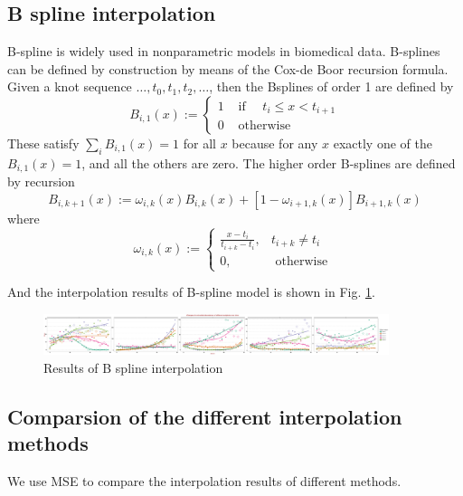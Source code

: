 \documentclass{article}
\begin{document}
\subsection{B spline interpolation}

B-spline is widely used in nonparametric models in biomedical data. B-splines can be defined by construction by means of the Cox-de Boor recursion formula. Given a knot sequence $\ldots, t_{0}, t_{1}, t_{2}, \ldots$, then the Bsplines of order 1 are defined by
\begin{equation}
    B_{i, 1}(x):= \begin{cases}1 & \text { if } \quad t_{i} \leq x<t_{i+1} \\ 0 & \text { otherwise }\end{cases}
    \end{equation}
These satisfy $\sum_{i} B_{i, 1}(x)=1$ for all $x$ because for any $x$ exactly one of the $B_{i, 1}(x)=1$, and all the others are zero.
The higher order B-splines are defined by recursion
\begin{equation}
    B_{i, k+1}(x):=\omega_{i, k}(x) B_{i, k}(x)+\left[1-\omega_{i+1, k}(x)\right] B_{i+1, k}(x)
\end{equation}
where
\begin{equation}
\omega_{i, k}(x):= \begin{cases}\frac{x-t_{i}}{t_{i+k}-t_{i}}, & t_{i+k} \neq t_{i} \\ 0, & \text { otherwise }\end{cases}
\end{equation}

And the interpolation results of B-spline model is shown in Fig. \ref{bs}.

\begin{figure}[h]
    \centering
    \includegraphics[width=0.9\textwidth]{figure/B_spline.pdf}
    \caption{Results of B spline interpolation}\label{bs}
\end{figure}


\subsection{Comparsion of the different interpolation methods}

We use MSE to compare the interpolation results of different methods.
\end{document}
